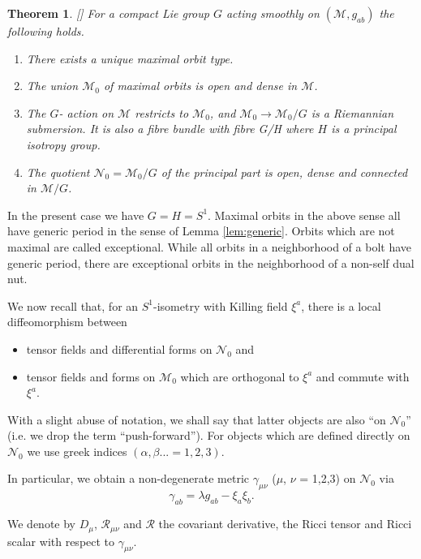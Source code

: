 \documentclass[a4paper,10pt,reqno]{amsart}
\newcommand{\cR}{\mathcal{R}}
\newcommand{\cM}{\mathcal{M}}
\newcommand{\cN}{\mathcal{N}}
\newcommand{\al}{\alpha}
\newcommand{\be}{\beta}
\theoremstyle{plain}
\newtheorem{thm}{Theorem}[section]
\numberwithin{equation}{section}
\begin{document}
\begin{thm}
\label{thm:quot}[\cite{MR889050}] 
For a compact Lie group $G$ acting smoothly on $(\cM, g_{ab})$ the following holds.  
\begin{enumerate}
\item There exists a unique maximal  orbit type.
\item The union $\cM_0$ of maximal orbits is open and dense  in $\cM$.
\item The $G$- action on $\cM$ restricts to $\cM_0$, and  $\cM_0 \rightarrow \cM_0 /G $
is a Riemannian submersion. It is also a fibre bundle with fibre G/H where $H$ is a principal isotropy group.
\item The quotient $\cN_0= \cM_0 /G$ of the principal part is open, dense and connected in $\cM /G $.
\end{enumerate} 

\end{thm}

In the present case we  have $G = H = S^1$.  
Maximal orbits in the above sense  all have generic period in the sense of Lemma \ref{lem:generic}.  
Orbits which are not maximal are called exceptional.
While all orbits in a neighborhood of a bolt have generic period, there are exceptional orbits in the neighborhood of a non-self dual nut. 

%

 We now recall \cite{1971JMP....12..918G} that, for an $S^1$-isometry with Killing field $\xi^a$,  there is a local diffeomorphism between 
\begin{itemize} 
\item  tensor fields and differential forms on $\cN_0$ and 
\item 
 tensor fields and forms on $\cM_0$ which are orthogonal to $\xi^a$ and  commute with  $\xi^a$.
 \end{itemize}
 With a slight abuse of notation, we shall say that latter  objects are also ``on  $\cN_{0}$''  (i.e. we drop the term ``push-forward'').
 For objects which are defined directly  on $\cN_0$ we use greek indices $(\al, \be...= 1,2,3)$. 

   In particular, we obtain a non-degenerate metric 
$\gamma_{\mu\nu}$ ($\mu$, $\nu$ = 1,2,3) on $\cN_0$ via
\begin{equation}
\gamma_{ab} = \lambda g_{ab} - \xi_{a}\xi_{b}.
\label{2Gamma}
\end{equation}

We denote by $D_{\mu}$, $\cR_{\mu\nu}$ and $\cR$ the covariant derivative,
the Ricci tensor and Ricci scalar with respect to $\gamma_{\mu\nu}$.
\end{document}
